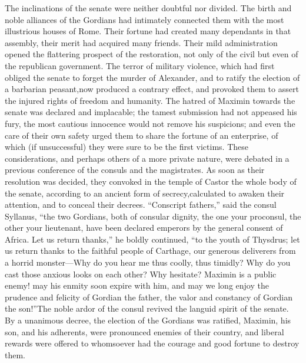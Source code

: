 
The inclinations of the senate were neither doubtful nor divided.
The birth and noble alliances of the Gordians had intimately
connected them with the most illustrious houses of Rome. Their
fortune had created many dependants in that assembly, their merit
had acquired many friends. Their mild administration opened the
flattering prospect of the restoration, not only of the civil but
even of the republican government. The terror of military
violence, which had first obliged the senate to forget the murder
of Alexander, and to ratify the election of a barbarian peasant,\footnotemark[21]
now produced a contrary effect, and provoked them to assert
the injured rights of freedom and humanity. The hatred of Maximin
towards the senate was declared and implacable; the tamest
submission had not appeased his fury, the most cautious innocence
would not remove his suspicions; and even the care of their own
safety urged them to share the fortune of an enterprise, of which
(if unsuccessful) they were sure to be the first victims. These
considerations, and perhaps others of a more private nature, were
debated in a previous conference of the consuls and the
magistrates. As soon as their resolution was decided, they
convoked in the temple of Castor the whole body of the senate,
according to an ancient form of secrecy,\footnotemark[22] calculated to awaken
their attention, and to conceal their decrees. “Conscript
fathers,” said the consul Syllanus, “the two Gordians, both of
consular dignity, the one your proconsul, the other your
lieutenant, have been declared emperors by the general consent of
Africa. Let us return thanks,” he boldly continued, “to the youth
of Thysdrus; let us return thanks to the faithful people of
Carthage, our generous deliverers from a horrid monster—Why do
you hear me thus coolly, thus timidly? Why do you cast those
anxious looks on each other? Why hesitate? Maximin is a public
enemy! may his enmity soon expire with him, and may we long enjoy
the prudence and felicity of Gordian the father, the valor and
constancy of Gordian the son!”\footnotemark[23] The noble ardor of the consul
revived the languid spirit of the senate. By a unanimous decree,
the election of the Gordians was ratified, Maximin, his son, and
his adherents, were pronounced enemies of their country, and
liberal rewards were offered to whomsoever had the courage and
good fortune to destroy them.


